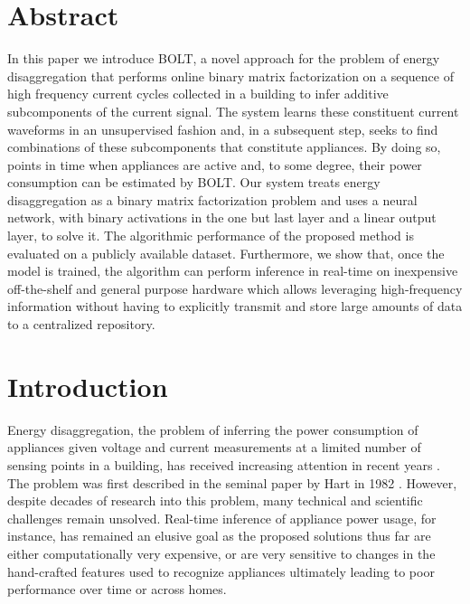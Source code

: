 
\newcommand{\ourname}{BOLT}

\section{Abstract}
In this paper we introduce \ourname, a novel approach for the problem of energy disaggregation that performs online binary matrix factorization on a sequence of high frequency current cycles collected in a building to infer additive subcomponents of the current signal. The system learns these constituent current waveforms in an unsupervised fashion and, in a subsequent step, seeks to find combinations of these subcomponents that constitute appliances. By doing so, points in time when appliances are active and, to some degree, their power consumption can be estimated by \ourname. Our system treats energy disaggregation as a binary matrix factorization problem and uses a neural network, with binary activations in the one but last layer and a linear output layer, to solve it. The algorithmic performance of the proposed method is evaluated on a publicly available dataset. Furthermore, we show that, once the model is trained, the algorithm can perform inference in real-time on inexpensive off-the-shelf and general purpose hardware which allows leveraging high-frequency information without having to explicitly transmit and store large amounts of data to a centralized repository.



%
%


\section{Introduction}

Energy disaggregation, the problem of inferring the power consumption of appliances given voltage and current measurements at a limited number of sensing points in a building, has received increasing attention in recent years \cite{zeifman2011nonintrusive, zoha2012non}. The problem was first described in the seminal paper by Hart in 1982 \cite{hart1992}. However, despite decades of research into this problem, many technical and scientific challenges remain unsolved. Real-time inference of appliance power usage, for instance, has remained an elusive goal as the proposed solutions thus far are either computationally very expensive, or are very sensitive to changes in the hand-crafted features used to recognize appliances ultimately leading to poor performance over time or across homes. 

